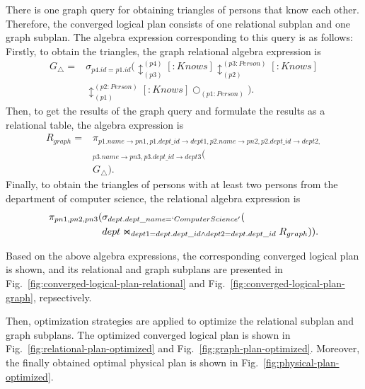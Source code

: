 \begin{example}
    There is one graph query for obtaining triangles of persons that know each other.
    Therefore, the converged logical plan consists of one relational subplan and one graph subplan.
    The algebra expression corresponding to this query is as follows:
    Firstly, to obtain the triangles, the graph relational algebra expression is
    \begin{equation*}
        \begin{split}
            G_{\triangle} = & \sigma_{p4.id = p1.id}(\updownarrow_{(p3)}^{(p4)}[:Knows]\updownarrow_{(p2)}^{(p3:Person)}[:Knows] \\
            & \updownarrow_{(p1)}^{(p2:Person)}[:Knows]\bigcirc_{(p1:Person)}).
        \end{split}
    \end{equation*}
    Then, to get the results of the graph query and formulate the results as a relational table, the algebra expression is 
    \begin{equation*}
        \begin{split}
            R_{graph} = & \pi_{p1.name\rightarrow pn1, p1.dept\_id \rightarrow dept1,p2.name\rightarrow pn2, p2.dept\_id \rightarrow dept2,} \\
            & _{p3.name\rightarrow pn3, p3.dept\_id \rightarrow dept3}( \\
            & G_{\triangle}).
        \end{split}
    \end{equation*}
    Finally, to obtain the triangles of persons with at least two persons from the department of computer science, the relational algebra expression is
    \begin{equation*}
        \begin{split}
        \pi_{pn1, pn2, pn3}
        (& \sigma_{dept.dept\_name = `Computer Science'}( \\ 
        & dept \Join_{dept1=dept.dept\_id \land dept2=dept.dept\_id} R_{graph})).
        \end{split}
    \end{equation*}

    Based on the above algebra expressions, the corresponding converged logical plan is shown, and its relational and graph subplans are presented in Fig.~\ref{fig:converged-logical-plan-relational} and Fig.~\ref{fig:converged-logical-plan-graph}, repsectively.
    
    Then, optimization strategies are applied to optimize the relational subplan and graph subplans.
    The optimized converged logical plan is shown in Fig.~\ref{fig:relational-plan-optimized} and Fig.~\ref{fig:graph-plan-optimized}.
    Moreover, the finally obtained optimal physical plan is shown in Fig.~\ref{fig:physical-plan-optimized}.
\end{example}

